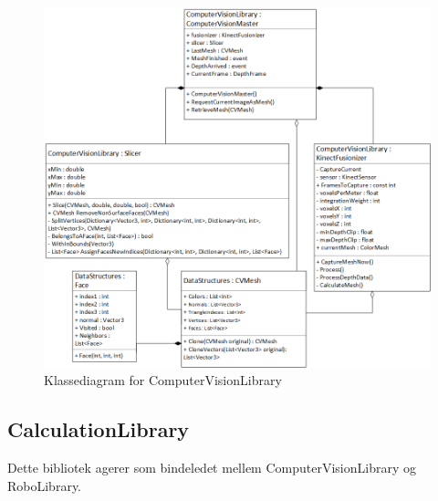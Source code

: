 \begin{figure}[H]
    \centering
    \includegraphics[width=1\textwidth]{figurer/d/Design/Class/uml_class_computervisionlibrary}
    \caption{Klassediagram for ComputerVisionLibrary}
    \label{class_ComputerVisionLib}
\end{figure}
\newpage

\subsection{CalculationLibrary}
Dette bibliotek agerer som bindeledet mellem ComputerVisionLibrary og RoboLibrary.


